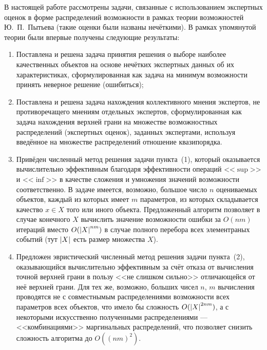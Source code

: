
В настоящей работе рассмотрены задачи, связанные с  использованием экспертных оценок в форме распределений возможности в рамках теории возможностей Ю.~П.~Пытьева (такие оценки были названы нечёткими). В рамках упомянутой теории были впервые получены следующие результаты:
\begin{enumerate}
\item
Поставлена и решена задача принятия решения о выборе наиболее качественных объектов на основе нечётких экспертных данных об их характеристиках, сформулированная как задача на минимум возможности принять неверное решение (ошибиться);
\item
Поставлена и решена задача нахождения коллективного мнения экспертов, не противоречащего мнениям отдельных экспертов, сформулированная как задача нахождения верхней грани на множестве возможностных распределений (экспертных оценок), заданных экспертами, используя введённое на множестве распределений отношение квазипорядка.
\item 
 Привёден численный метод решения задачи пункта~(1), который оказывается вычислительно эффективным благодаря эффективности операций <<$\sup$>> и <<$\inf$>> в качестве сложения и умножения значений возможности соответственно. В задаче имеется, возможно, большое число  $n$ оцениваемых объектов, каждый из которых имеет $m$ параметров, из которых складывается качество $x \in X$ того или иного объекта. Предложенный алгоритм позволяет в случае конечного $X$ вычислить значение возможности ошибки за $O(nm)$ итераций вместо $O(\left| X \right|^{nm})$ в случае полного перебора всех элементраных событий (тут $\left| X \right|$ есть размер множества $X$).
 \item
 Предложен эвристический численный метод решения задачи пункта~(2), оказывающийся вычислительно эффективным за счёт отказа от вычисления точной верхней грани в пользу <<не слишком сильно>> отличающейся от неё верхней грани. Для тех же, возможно, больших чисел $n$, $m$ вычисления проводятся не с совместнымым распределениями возможности всех параметров всех объектов, что имело бы сложность $O(\left| X \right|^{2nm})$, а с некоторыми искусственно полученными распределениями --- <<комбинациями>> маргинальных распределений, что позволяет снизить сложность алгоритма до $O((nm)^2)$.   
\end{enumerate}

